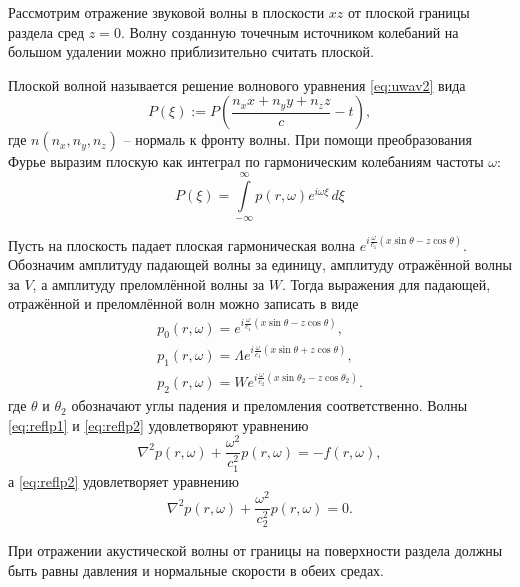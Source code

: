 \documentclass[a4paper, fontsize=14pt]{article}
\begin{document}
	Рассмотрим отражение звуковой волны в плоскости $xz$ от плоской границы раздела сред $z=0$. Волну созданную точечным источником колебаний на большом удалении можно приблизительно считать плоской. 

	Плоской волной называется решение волнового уравнения \eqref{eq:uwav2} вида $$P(\xi) := P\left(\frac{n_xx+n_yy+n_zz}{c}-t\right),$$ где $n(n_x,n_y,n_z)$ -- нормаль к фронту волны.
	При помощи преобразования Фурье выразим плоскую как интеграл по гармоническим колебаниям частоты $\omega$:
	\begin{equation}
		P(\xi) = \int \limits_{-\infty}^{\infty} p(r,\omega) e^{i\omega \xi}\, d\xi 
	\end{equation}

	Пусть на плоскость падает плоская гармоническая волна $e^{i\frac{\omega}{c_1}(x\sin \theta - z\cos \theta)}$.
	Обозначим амплитуду падающей волны за единицу, амплитуду отражённой волны за $V$, а амплитуду преломлённой волны за $W$.
	Тогда выражения для падающей, отражённой и преломлённой волн можно записать в виде \cite{brehovskih} 
	\begin{gather}
		p_0(r,\omega) = e^{i\frac{\omega}{c_1}(x\sin \theta - z\cos \theta)},\label{eq:reflp0}\\ 
		p_1(r,\omega) = \Lambda e^{i\frac{\omega}{c_1}(x\sin \theta + z\cos \theta)},\label{eq:reflp1}\\
		p_2(r,\omega) = W e^{i\frac{\omega}{c_2}(x\sin \theta_2 - z\cos \theta_2)}\label{eq:reflp2}.
	\end{gather}
	где $\theta$ и $\theta_2$ обозначают углы падения и преломления соответственно. Волны \eqref{eq:reflp1} и \eqref{eq:reflp2} удовлетворяют уравнению 
	\begin{equation}
		\nabla^2 p(r,\omega) + \frac{\omega^2}{c_1^2}p(r,\omega) = - f(r,\omega),
	\end{equation}
	а  \eqref{eq:reflp2} удовлетворяет уравнению
	\begin{equation}
		\nabla^2 p(r,\omega) + \frac{\omega^2}{c_2^2}p(r,\omega) = 0.
	\end{equation}
	
	При отражении акустической волны от границы на поверхности раздела должны быть равны давления и нормальные скорости в обеих средах. \cite{landavshic}
	
\end{document}
